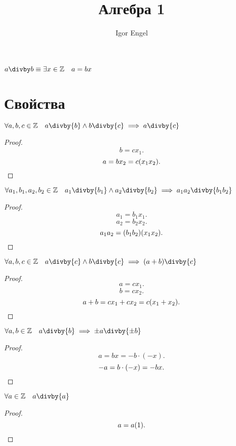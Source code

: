 \documentclass[11pt, oneside]{article}   	%
\title{Алгебра 1}
\author{Igor Engel}
\date{}
\begin{document}
\maketitle
\begin{definition}
    $a\divby b \equiv \exists x\in\mathbb{Z}\quad a = bx$
\end{definition}
\section{Свойства}
    \begin{dlemma}
        $\forall{a, b, c\in\mathbb{Z}}\quad a\divby{b}\wedge b\divby{c} \implies a\divby{c}$ 
        \begin{proof}
            \[ b = cx_1 .\] 
            \[ a = bx_2 = c(x_1x_2) .\qedhere\] 
        \end{proof}
    \end{dlemma}
    \begin{dlemma}
        $\forall{a_1,b_1,a_2,b_2\in \mathbb{Z}}\quad a_1\divby{b_1}\wedge a_2\divby{b_2} \implies a_1a_2\divby{b_1b_2}$
        \begin{proof}
            \[ a_1=b_1x_1 .\]
            \[ a_2=b_2x_2 .\]
            \[ a_1a_2=(b_1b_2)(x_1x_2). \qedhere\] 
        \end{proof}
    \end{dlemma}
    \begin{dlemma}
        $\forall{a,b,c\in \mathbb{Z}}\quad a\divby{c}\wedge b\divby{c} \implies (a+b)\divby{c}$ 
        \begin{proof}
            \[ a=cx_1 .\]
            \[ b=cx_2 .\]
            \[ a+b=cx_1+cx_2=c(x_1+x_2) . \qedhere\]
        \end{proof}
    \end{dlemma}
    \begin{dlemma}
        $\forall{a,b\in \mathbb{Z}}\quad a\divby{b} \implies \pm{a}\divby{\pm{b}}$
        \begin{proof}
            \[ a = bx = -b\cdot(-x) .\]
            \[ -a = b\cdot(-x) = -bx .\qedhere\]

        \end{proof}
    \end{dlemma}
    \begin{dlemma}
        $\forall{a\in \mathbb{Z}}\quad a\divby{a}$ 
        \begin{proof}
            \[ a=a(1) .\qedhere\] 
        \end{proof}
    \end{dlemma}
\end{document}
